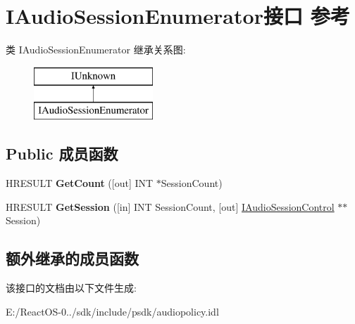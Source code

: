 \hypertarget{interface_i_audio_session_enumerator}{}\section{I\+Audio\+Session\+Enumerator接口 参考}
\label{interface_i_audio_session_enumerator}
类 I\+Audio\+Session\+Enumerator 继承关系图\+:\begin{figure}[H]
\begin{center}
\leavevmode
\includegraphics[height=2.000000cm]{interface_i_audio_session_enumerator}
\end{center}
\end{figure}
\subsection*{Public 成员函数}
\begin{DoxyCompactItemize}
\item 
\mbox{\label{interface_i_audio_session_enumerator_a0fa8f1f9ca1637d2ed4a0b868c820c7c}} 
H\+R\+E\+S\+U\+LT {\bfseries Get\+Count} (\mbox{[}out\mbox{]} I\+NT $\ast$Session\+Count)
\item 
\mbox{\label{interface_i_audio_session_enumerator_a8f5027700fbc5ccf23352d661d3b521b}} 
H\+R\+E\+S\+U\+LT {\bfseries Get\+Session} (\mbox{[}in\mbox{]} I\+NT Session\+Count, \mbox{[}out\mbox{]} \hyperlink{interface_i_audio_session_control}{I\+Audio\+Session\+Control} $\ast$$\ast$Session)
\end{DoxyCompactItemize}
\subsection*{额外继承的成员函数}


该接口的文档由以下文件生成\+:\begin{DoxyCompactItemize}
\item 
E\+:/\+React\+O\+S-\/0../sdk/include/psdk/audiopolicy.\+idl\end{DoxyCompactItemize}
